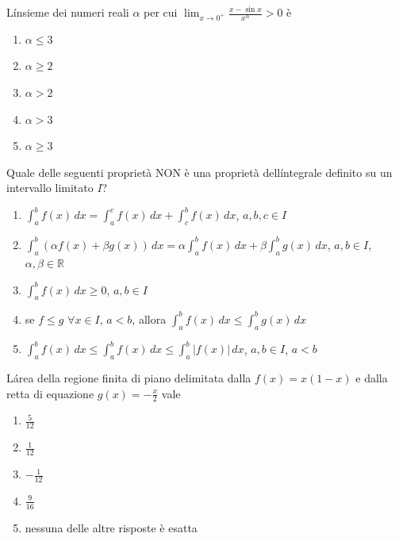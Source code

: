 \begin{quiz}
L\'insieme dei numeri reali $\alpha$ per cui $\displaystyle\lim_{x\to0^+}\frac{x-\sin x}{x^\alpha}>0$ \`e
\begin{enumerate}
\item $\alpha\leq3$
\item $\alpha\geq2$
\item $\alpha>2$
\item $\alpha>3$
\item $\alpha\geq3$
\end{enumerate}
\end{quiz}

\begin{quiz}
Quale delle seguenti propriet\`a NON \`e una propriet\`a dell\'integrale definito su un intervallo limitato $I$?
\begin{enumerate}
\item $\int_a^bf(x)\,dx=\int_a^cf(x)\,dx+\int_c^bf(x)\,dx$, $a,b,c\in I$
\item $\int_a^b(\alpha f(x)+\beta g(x))\,dx=\alpha\int_a^bf(x)\,dx+\beta\int_a^bg(x)\,dx$, $a,b\in I$, $\alpha,\beta\in\mathbb R$
\item $\int_a^bf(x)\,dx\geq0$, $a,b\in I$
\item se $f\leq g$ $\forall x\in I$, $a<b$, allora $\int_a^bf(x)\,dx\leq\int_a^bg(x)\,dx$
\item $\int_a^bf(x)\,dx\leq\int_a^bf(x)\,dx\leq\int_a^b|f(x)|\,dx$, $a,b\in I$, $a<b$
\end{enumerate}
\end{quiz}

\begin{quiz}
L\'area della regione finita di piano delimitata dalla $f(x)=x(1-x)$ e dalla retta di equazione $g(x)=-\frac x2$ vale
\begin{enumerate}
\item $\frac5{12}$
\item $\frac1{12}$
\item $-\frac1{12}$
\item $\frac9{16}$
\item nessuna delle altre risposte \`e esatta
\end{enumerate}
\end{quiz}

